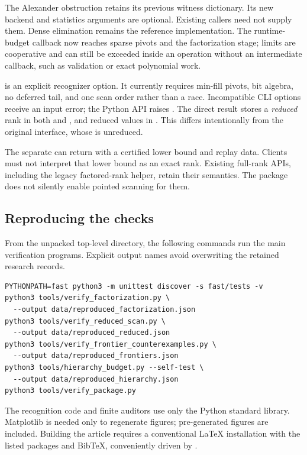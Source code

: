 The Alexander obstruction retains its previous witness dictionary.  Its
new backend and statistics arguments are optional.  Existing callers need
not supply them.  Dense elimination remains the reference implementation.
The runtime-budget callback now reaches sparse pivots and the factorization
stage; limits are cooperative and can still be exceeded inside an operation
without an intermediate callback, such as validation or exact polynomial work.

 is an explicit recognizer option.  It currently requires
min-fill pivots, bit algebra, no deferred tail, and one scan order rather
than a race.  Incompatible CLI options receive an input error; the Python
API raises .  The direct
 result stores a \emph{reduced} rank in both
 and , and reduced values in
.  This differs intentionally from the original
 interface, whose  is unreduced.

The separate  can return
 with a certified lower bound and replay data.
Clients must not interpret that lower bound as an exact rank.  Existing
full-rank APIs, including the legacy factored-rank helper, retain their
semantics.  The package does not silently enable pointed scanning for them.

\subsection{Reproducing the checks}

From the unpacked top-level directory, the following commands run the main
verification programs.  Explicit output names avoid overwriting the retained
research records.

\begin{lstlisting}
PYTHONPATH=fast python3 -m unittest discover -s fast/tests -v
python3 tools/verify_factorization.py \
  --output data/reproduced_factorization.json
python3 tools/verify_reduced_scan.py \
  --output data/reproduced_reduced.json
python3 tools/verify_frontier_counterexamples.py \
  --output data/reproduced_frontiers.json
python3 tools/hierarchy_budget.py --self-test \
  --output data/reproduced_hierarchy.json
python3 tools/verify_package.py
\end{lstlisting}

The recognition code and finite auditors use only the Python standard
library.  Matplotlib is needed only to regenerate figures; pre-generated
figures are included.  Building the article requires a conventional
\LaTeX{} installation with the listed packages and BibTeX, conveniently
driven by \code{latexmk}.

